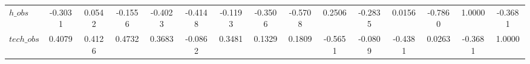 \begin{center}
\begin{longtable}{lcccccccccccccc}
$h\_obs         $	 & 	          -0.3031	 & 	           0.0542	 & 	          -0.1556	 & 	          -0.4023	 & 	          -0.4148	 & 	          -0.1193	 & 	          -0.3506	 & 	          -0.5708	 & 	           0.2506	 & 	          -0.2835	 & 	           0.0156	 & 	          -0.7860	 & 	           1.0000	 & 	          -0.3681 \\ 
$tech\_obs      $	 & 	           0.4079	 & 	           0.4126	 & 	           0.4732	 & 	           0.3683	 & 	          -0.0862	 & 	           0.3481	 & 	           0.1329	 & 	           0.1809	 & 	          -0.5651	 & 	          -0.0809	 & 	          -0.4381	 & 	           0.0263	 & 	          -0.3681	 & 	           1.0000 \\ 
\end{longtable}
 \end{center}
